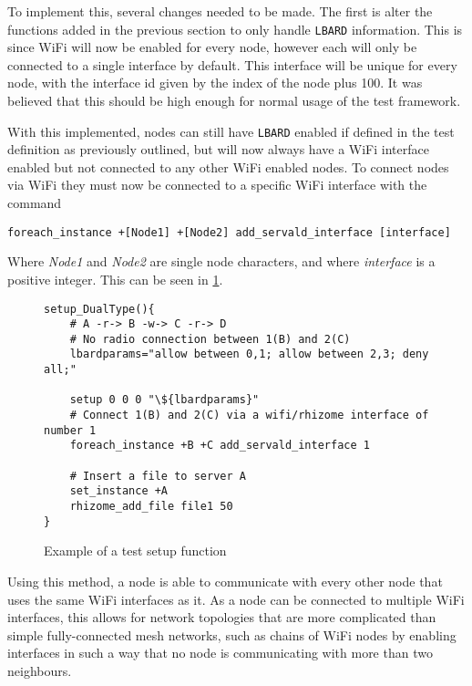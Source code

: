 To implement this, several changes needed to be made.
The first is alter the functions added in the previous section to only handle \texttt{LBARD} information.
This is since WiFi will now be enabled for every node, however each will only be connected to a single interface by default.
This interface will be unique for every node, with the interface id given by the index of the node plus 100.
It was believed that this should be high enough for normal usage of the test framework.

With this implemented, nodes can still have \texttt{LBARD} enabled if defined in the test definition as previously outlined, but will now always have a WiFi interface enabled but not connected to any other WiFi enabled nodes.
To connect nodes via WiFi they must now be connected to a specific WiFi interface with the command
\begin{lstlisting}[numbers=none, basicstyle=\small]
foreach_instance +[Node1] +[Node2] add_servald_interface [interface]
\end{lstlisting}
Where \emph{Node1} and \emph{Node2} are single node characters, and where \emph{interface} is a positive integer.
This can be seen in \figurename{ \ref{fig:definingInterfaces}}.

\lstset{language=bash,
showstringspaces=false,
numbers=left,
}

\begin{figure}[h!]
    \begin{centering}
        \begin{lstlisting}[breaklines, frame=single]
setup_DualType(){
    # A -r-> B -w-> C -r-> D
    # No radio connection between 1(B) and 2(C)
    lbardparams="allow between 0,1; allow between 2,3; deny all;"

    setup 0 0 0 "\${lbardparams}"
    # Connect 1(B) and 2(C) via a wifi/rhizome interface of number 1
    foreach_instance +B +C add_servald_interface 1

    # Insert a file to server A
    set_instance +A
    rhizome_add_file file1 50
}
        \end{lstlisting}
        \caption{Example of a test setup function}
        \label{fig:definingInterfaces}
    \end{centering}
\end{figure}

Using this method, a node is able to communicate with every other node that uses the same WiFi interfaces as it.
As a node can be connected to multiple WiFi interfaces, this allows for network topologies that are more complicated than simple fully-connected mesh networks, such as chains of WiFi nodes by enabling interfaces in such a way that no node is communicating with more than two neighbours.


